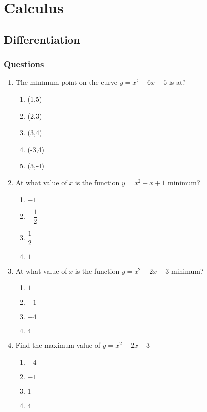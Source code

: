 \chapter{Calculus}
\section{Differentiation}
\subsection{Questions}
\begin{multicols}{2}
\begin{enumerate}[label={\arabic*.}]
\item The minimum point on the curve \(y = {x}^{2} - 6x + 5\) is at?
	\begin{enumerate}[label={\Alph*.}]
		\item (1,5)
		\item (2,3)
		\item (3,4)
		\item (-3,4)
		\item (3,-4)
	\end{enumerate}
\item At what value of \(x\) is the function \(y = {x}^{2} + x + 1\) minimum? 
	\begin{enumerate}[label={\Alph*.}]
		\item \(-1\)
		\item \(-\dfrac{1}{2}\)
		\item \(\dfrac{1}{2}\)
		\item \(1\)
	\end{enumerate}
\item At what value of \(x\) is the function \(y = {x}^{2} - 2x - 3\) minimum?
\begin{enumerate}[label={\Alph*.}]
		\item \(1\) 
		\item \(-1\) 
		\item \(-4\)
		\item \(4\)
	\end{enumerate}
\item Find the maximum value of \(y = {x}^{2} - 2x - 3\)
	\begin{enumerate}[label={\Alph*.}]
		\item \(-4\)
		\item \(-1\)
		\item \(1\)
		\item \(4\)
	\end{enumerate}

\end{enumerate}
\end{multicols}
